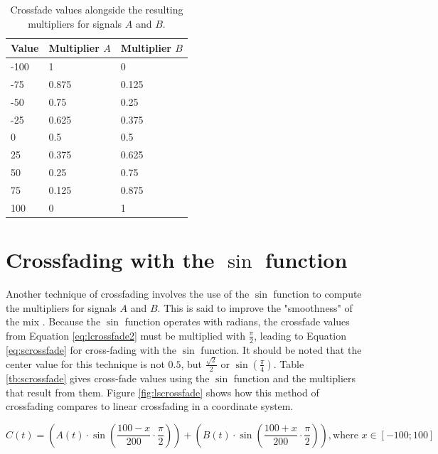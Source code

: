 \documentclass[12pt,twoside]{report}
\begin{document}
\begin{table}[h!]

  \centering

  \begin{tabular}[]{| l | l | l |}
    \hline
    \rowcolor[gray]{0.8}
    Value & Multiplier $A$ & Multiplier $B$ \\\hline
    -100 & 1 & 0\\\hline
    -75 & 0.875 & 0.125\\\hline
    -50 & 0.75 & 0.25\\\hline
    -25 & 0.625 & 0.375\\\hline
    0 & 0.5 & 0.5\\\hline
    25 & 0.375 & 0.625\\\hline
    50 & 0.25 & 0.75\\\hline
    75 & 0.125 & 0.875\\\hline
    100 & 0 & 1\\
    \hline
  \end{tabular}

  \caption{Crossfade values alongside the resulting multipliers for signals $A$ and $B$.}

  \label{tb:lcrossfade}

\end{table}

\section{Crossfading with the $\sin$ function}

Another technique of crossfading involves the use of the $\sin$ function to compute the multipliers for signals $A$ and $B$. This is said to improve the "smoothness" of the mix . Because the $\sin$ function operates with radians, the crossfade values from Equation \ref{eq:lcrossfade2} must be multiplied with $\frac{\pi}{2}$, leading to Equation \ref{eq:scrossfade} for cross-fading with the $\sin$ function. It should be noted that the center value for this technique is not $0.5$, but $\frac{\sqrt{2}}{2}$ or $\sin(\frac{\pi}{4})$. Table \ref{tb:scrossfade} gives cross-fade values using the $\sin$ function and the multipliers that result from them. Figure \ref{fig:lscrossfade} shows how this method of crossfading compares to linear crossfading in a coordinate system.

\begin{equation}
  C(t) = (A(t) \cdot \sin(\frac{100 - x}{200} \cdot \frac{\pi}{2})) + (B(t) \cdot \sin(\frac{100 + x}{200} \cdot \frac{\pi}{2})), \text{where } x \in [-100;100]
  \label{eq:scrossfade}
\end{equation}
\end{document}

